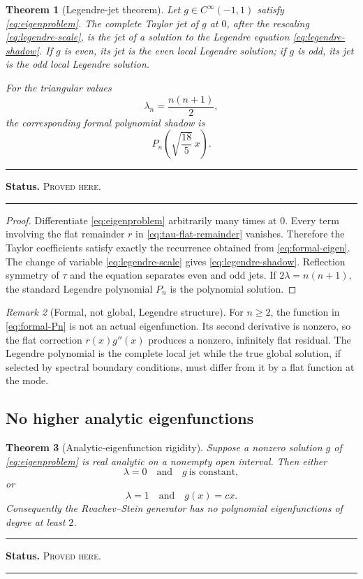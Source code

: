 \documentclass[11pt,oneside]{article}
\newtheorem{theorem}{Theorem}[section]
\theoremstyle{definition}
\theoremstyle{remark}
\newtheorem{remark}[theorem]{Remark}
\newenvironment{boxedremark}{%
  \par\smallskip\noindent\begin{center}\begin{minipage}{0.94\textwidth}%
  \color{black}\hrule\vspace{0.6em}\small
}{%
  \vspace{0.6em}\hrule\end{minipage}\end{center}\smallskip
}
\newcommand{\ProvedHere}{\textsc{Proved here}}
\newcommand{\Status}[1]{%
  \begin{boxedremark}\textbf{Status.} #1.\end{boxedremark}}
\begin{document}
\begin{theorem}[Legendre-jet theorem]\label{thm:legendre-jet}
Let $g\in C^\infty(-1,1)$ satisfy \eqref{eq:eigenproblem}.  The complete Taylor
jet of $g$ at $0$, after the rescaling \eqref{eq:legendre-scale}, is the jet of a
solution to the Legendre equation \eqref{eq:legendre-shadow}.  If $g$ is even,
its jet is the even local Legendre solution; if $g$ is odd, its jet is the odd
local Legendre solution.

For the triangular values
\begin{equation}\label{eq:triangular-lambda}
 \lambda_n=\frac{n(n+1)}2,
\end{equation}
the corresponding formal polynomial shadow is
\begin{equation}\label{eq:formal-Pn}
 P_n\!\left(\sqrt{\frac{18}{5}}\,x\right).
\end{equation}
\end{theorem}
\Status{\ProvedHere}

\begin{proof}
Differentiate \eqref{eq:eigenproblem} arbitrarily many times at $0$.  Every term
involving the flat remainder $r$ in \eqref{eq:tau-flat-remainder} vanishes.
Therefore the Taylor coefficients satisfy exactly the recurrence obtained from
\eqref{eq:formal-eigen}.  The change of variable \eqref{eq:legendre-scale} gives
\eqref{eq:legendre-shadow}.  Reflection symmetry of $\tau$ and the equation
separates even and odd jets.  If $2\lambda=n(n+1)$, the standard Legendre
polynomial $P_n$ is the polynomial solution.
\end{proof}

\begin{remark}[Formal, not global, Legendre structure]
For $n\ge2$, the function in \eqref{eq:formal-Pn} is not an actual eigenfunction.
Its second derivative is nonzero, so the flat correction $r(x)g''(x)$ produces a
nonzero, infinitely flat residual.  The Legendre polynomial is the complete local
jet while the true global solution, if selected by spectral boundary conditions,
must differ from it by a flat function at the mode.
\end{remark}

\subsection{No higher analytic eigenfunctions}
\begin{theorem}[Analytic-eigenfunction rigidity]\label{thm:analytic-eigen}
Suppose a nonzero solution $g$ of \eqref{eq:eigenproblem} is real analytic on a
nonempty open interval.  Then either
\[
 \lambda=0\quad\text{and}\quad g\ \text{is constant},
\]
or
\[
 \lambda=1\quad\text{and}\quad g(x)=cx.
\]
Consequently the Rvachev--Stein generator has no polynomial eigenfunctions of
degree at least $2$.
\end{theorem}
\Status{\ProvedHere}
\end{document}
